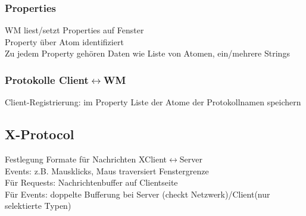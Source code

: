\subsubsection{Properties}
WM liest/setzt Properties auf Fenster\\
Property über Atom identifiziert\\
Zu jedem Property gehören Daten wie Liste von Atomen, ein/mehrere Strings

\subsubsection{Protokolle Client$\leftrightarrow$WM}
Client-Registrierung: im Property  Liste der Atome der Protokollnamen speichern

\subsection{X-Protocol}
Festlegung Formate für Nachrichten XClient$\leftrightarrow$Server\\
Events: z.B. Mausklicks, Maus traversiert Fenstergrenze\\
Für Requests: Nachrichtenbuffer auf Clientseite\\
Für Events: doppelte Bufferung bei Server (checkt Netzwerk)/Client(nur selektierte Typen)



